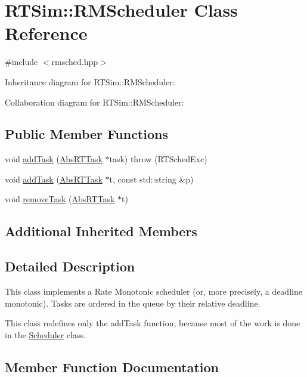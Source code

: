 \hypertarget{classRTSim_1_1RMScheduler}{}\section{R\+T\+Sim\+:\+:R\+M\+Scheduler Class Reference}
\label{classRTSim_1_1RMScheduler}


{\ttfamily \#include $<$rmsched.\+hpp$>$}



Inheritance diagram for R\+T\+Sim\+:\+:R\+M\+Scheduler\+:


Collaboration diagram for R\+T\+Sim\+:\+:R\+M\+Scheduler\+:
\subsection*{Public Member Functions}
\begin{DoxyCompactItemize}
\item 
void \hyperlink{classRTSim_1_1RMScheduler_ab801cf2db63265b32754970926767d71}{add\+Task} (\hyperlink{classRTSim_1_1AbsRTTask}{Abs\+R\+T\+Task} $\ast$task)  throw (\+R\+T\+Sched\+Exc)
\item 
void \hyperlink{classRTSim_1_1RMScheduler_a6e198cb68659646312044be80e4846e0}{add\+Task} (\hyperlink{classRTSim_1_1AbsRTTask}{Abs\+R\+T\+Task} $\ast$t, const std\+::string \&p)
\item 
void \hyperlink{classRTSim_1_1RMScheduler_a1da3ad63712a98b5e95967d4b2627c0e}{remove\+Task} (\hyperlink{classRTSim_1_1AbsRTTask}{Abs\+R\+T\+Task} $\ast$t)
\end{DoxyCompactItemize}
\subsection*{Additional Inherited Members}


\subsection{Detailed Description}
This class implements a Rate Monotonic scheduler (or, more precisely, a deadline monotonic). Tasks are ordered in the queue by their relative deadline.

This class redefines only the add\+Task function, because most of the work is done in the \hyperlink{classRTSim_1_1Scheduler}{Scheduler} class. 

\subsection{Member Function Documentation}
